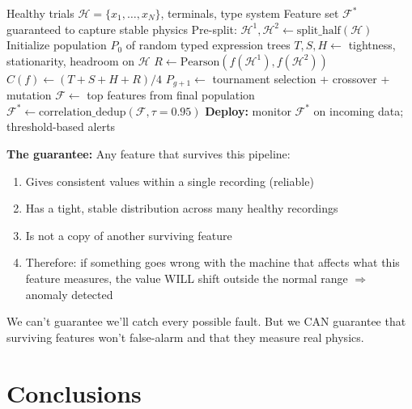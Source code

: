 \documentclass[11pt,a4paper]{article}
\begin{document}
\begin{algorithm}
\caption{Reliability-Aware Feature Discovery}
\begin{algorithmic}[1]
\Require Healthy trials $\mathcal{H} = \{x_1, \ldots, x_N\}$, terminals, type system
\Ensure Feature set $\mathcal{F}^*$ guaranteed to capture stable physics
\State Pre-split: $\mathcal{H}^1, \mathcal{H}^2 \gets \text{split\_half}(\mathcal{H})$
\State Initialize population $P_0$ of random typed expression trees
        \State $T, S, H \gets$ tightness, stationarity, headroom on $\mathcal{H}$
        \State $R \gets \text{Pearson}(f(\mathcal{H}^1), f(\mathcal{H}^2))$
        \State $C(f) \gets (T + S + H + R) / 4$
    \EndFor
    \State $P_{g+1} \gets$ tournament selection + crossover + mutation
\EndFor
\State $\mathcal{F} \gets$ top features from final population
\State $\mathcal{F}^* \gets \text{correlation\_dedup}(\mathcal{F}, \tau=0.95)$
\State \textbf{Deploy:} monitor $\mathcal{F}^*$ on incoming data; threshold-based alerts
\end{algorithmic}
\end{algorithm}

\begin{plainbox}
\textbf{The guarantee:} Any feature that survives this pipeline:
\begin{enumerate}
    \item Gives consistent values within a single recording (reliable)
    \item Has a tight, stable distribution across many healthy recordings
    \item Is not a copy of another surviving feature
    \item Therefore: if something goes wrong with the machine that affects what
    this feature measures, the value WILL shift outside the normal range
    $\Rightarrow$ anomaly detected
\end{enumerate}
We can't guarantee we'll catch every possible fault. But we CAN guarantee
that surviving features won't false-alarm and that they measure real physics.
\end{plainbox}

\section{Conclusions}
\end{document}
